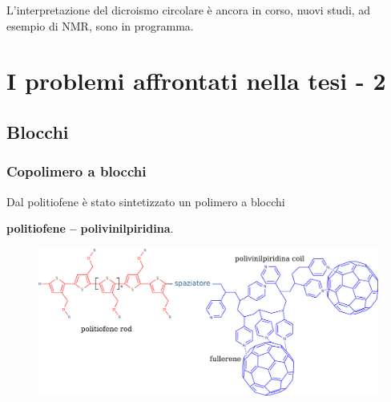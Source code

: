 \documentclass{beamer}
\begin{document}
\begin{frame}
\bigskip
L'interpretazione del dicroismo circolare è ancora in corso, nuovi studi, ad esempio di NMR, sono in programma.
\end{frame}

\makeatletter
{}
\makeatother

\section{I problemi affrontati nella tesi - 2}
\subsection{Blocchi}
\begin{frame}%
\frametitle{Copolimero a blocchi}
{\hfill Dal politiofene è stato sintetizzato un polimero a blocchi \hfill}

{\hfill \textbf{{\color{red}politiofene} -- {\color{blue}polivinilpiridina}}. \hfill}
\begin{figure}\centering \includegraphics[width=1.15\textwidth]{img/blocchi-fullereni-colori.pdf}\vspace{-90pt}\end{figure}
\end{frame}
\end{document}
